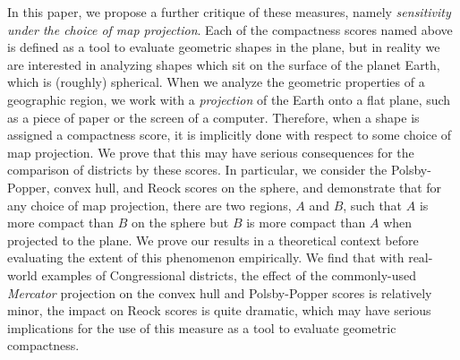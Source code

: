 In this paper, we propose a further critique of these measures, namely
\textit{sensitivity under the choice of map projection}.  Each of the
compactness scores named above is defined as a tool to evaluate
geometric shapes in the plane, but in reality we are interested in
analyzing shapes which sit on the surface of the planet Earth, which
is (roughly) spherical.  
When we analyze the geometric properties of a geographic region, we work 
with a \textit{projection} of the Earth onto a flat plane, such as a piece of 
paper or the screen of a computer.
Therefore, when a shape is assigned a compactness score,
it is implicitly done with respect to some choice of map projection.
We prove that this may have
serious consequences for the comparison of districts by these scores.  In
particular, we consider the Polsby-Popper, convex hull,
and Reock scores on the sphere, and demonstrate that for any choice of
map projection, there are two regions, $A$ and $B$, such that $A$ is
more compact than $B$ on the sphere but $B$ is more compact than $A$
when projected to the plane.  We prove our results in a theoretical context 
before evaluating the extent of this phenomenon empirically.  We find 
that with real-world examples of Congressional districts, the effect 
of the commonly-used \textit{Mercator} projection on the convex 
hull and Polsby-Popper scores is relatively minor, the impact on 
Reock scores is quite dramatic, which may have serious implications 
for the use of this measure as a tool to evaluate geometric compactness.

